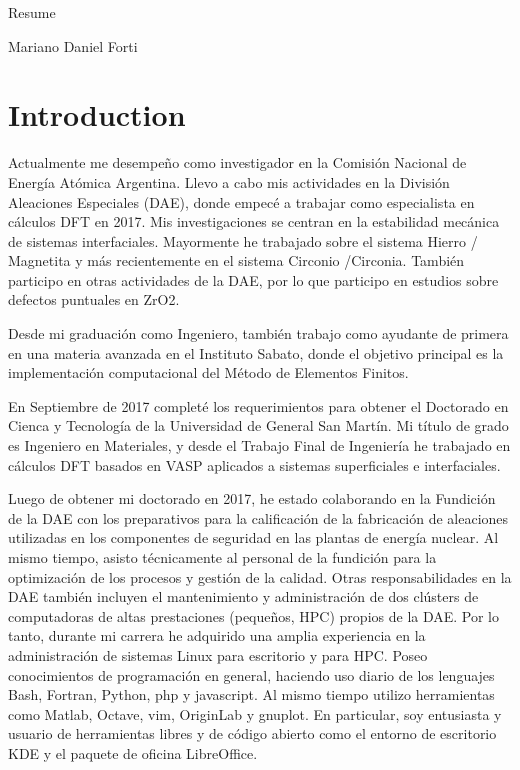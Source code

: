 Resume

Mariano Daniel Forti

\section{Introduction}\label{introduction}

Actualmente me desempeño como investigador en la Comisión Nacional de
Energía Atómica Argentina. Llevo a cabo mis actividades en la División
Aleaciones Especiales (DAE), donde empecé a trabajar como especialista
en cálculos DFT en 2017. Mis investigaciones se centran en la
estabilidad mecánica de sistemas interfaciales. Mayormente he trabajado
sobre el sistema Hierro / Magnetita y más recientemente en el sistema
Circonio /Circonia. También participo en otras actividades de la DAE,
por lo que participo en estudios sobre defectos puntuales en ZrO2.

Desde mi graduación como Ingeniero, también trabajo como ayudante de
primera en una materia avanzada en el Instituto Sabato, donde el
objetivo principal es la implementación computacional del Método de
Elementos Finitos.

En Septiembre de 2017 completé los requerimientos para obtener el
Doctorado en Cienca y Tecnología de la Universidad de General San
Martín. Mi título de grado es Ingeniero en Materiales, y desde el
Trabajo Final de Ingeniería he trabajado en cálculos DFT basados en VASP
aplicados a sistemas superficiales e interfaciales.

Luego de obtener mi doctorado en 2017, he estado colaborando en la
Fundición de la DAE con los preparativos para la calificación de la
fabricación de aleaciones utilizadas en los componentes de seguridad en
las plantas de energía nuclear. Al mismo tiempo, asisto técnicamente al
personal de la fundición para la optimización de los procesos y gestión
de la calidad. Otras responsabilidades en la DAE también incluyen el
mantenimiento y administración de dos clústers de computadoras de altas
prestaciones (pequeños, HPC) propios de la DAE. Por lo tanto, durante mi
carrera he adquirido una amplia experiencia en la administración de
sistemas Linux para escritorio y para HPC. Poseo conocimientos de
programación en general, haciendo uso diario de los lenguajes Bash,
Fortran, Python, php y javascript. Al mismo tiempo utilizo herramientas
como Matlab, Octave, vim, OriginLab y gnuplot. En particular, soy
entusiasta y usuario de herramientas libres y de código abierto como el
entorno de escritorio KDE y el paquete de oficina LibreOffice.

